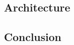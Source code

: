 \documentclass[a4paper, 11pt, oneside]{elsarticle}
\begin{document}
\subsection{Architecture}

\subsection{Conclusion}



\newpage



\end{document}
